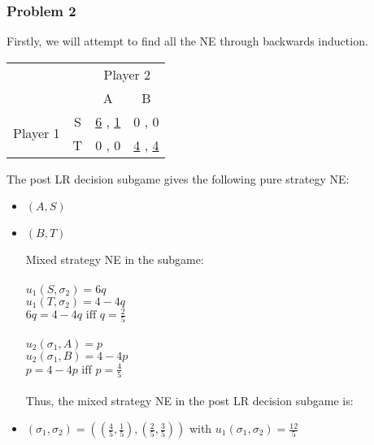 \documentclass[a4paper]{article}
\begin{document}
\subsubsection{Problem 2}
Firstly, we will attempt to find all the NE through backwards induction.

\begin{tabular}{ c c c c  } 

&& \multicolumn{2}{c}{Player 2} \\

&& A & B \\ 
\multirow{2}{4em}{Player 1} & S & \underline{6} , \underline{1} & 0 , 0  \\ 
 & T & 0 , 0 & \underline{4} , \underline{4} \\

\end{tabular}

The post LR decision subgame gives the following pure strategy NE: 
\begin{itemize}
\item
$(A,S)$ 
\item
$(B,T)$

Mixed strategy NE in the subgame:\\
\\
$u_1(S,\sigma_2)=6q$\\
$u_1(T,\sigma_2)=4-4q$\\
$6q=4-4q \text{ iff } q=\frac{2}{5}$\\
\\
$u_2(\sigma_1,A)=p$\\
$u_2(\sigma_1,B)=4-4p$\\
$p=4-4p \text{ iff }p=\frac{4}{5}$\\
\\
Thus, the mixed strategy NE in the post LR decision subgame is:
\item
$(\sigma_1,\sigma_2)=((\frac{4}{5},\frac{1}{5}),(\frac{2}{5},\frac{3}{5}))$ with $u_1(\sigma_1,\sigma_2)=\frac{12}{5}$\\
\end{itemize}
\end{document}
